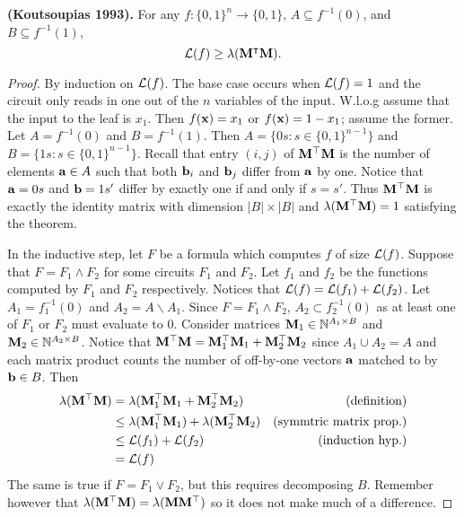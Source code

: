\documentclass[11pt]{article}
\begin{document}
	\begin{theorem}
		\textbf{(Koutsoupias 1993).} For any $f: \{0, 1\}^n \rightarrow \{0,1\}$, $A \subseteq f^{-1}(0)$, and $B \subseteq f^{-1}(1)$,
		\[\mathcal{L}(f) \geq \lambda(\mathbf{M}^{\intercal}\mathbf{M}).\]
	\end{theorem}
	\begin{proof}
		By induction on $\mathcal{L}(f)$. The base case occurs when $\mathcal{L}(f) = 1$ and the circuit only reads in one out of the $n$ variables of the input. W.l.o.g assume that the input to the leaf is $x_1$. Then $f(\mathbf{x}) = x_1$ or $f(\mathbf{x}) = 1 - x_1$; assume the former. Let $A = f^{-1}(0)$ and $B = f^{-1}(1)$. Then $A = \{0s: s \in \{0,1\}^{n-1}\}$ and $B = \{1s: s \in \{0,1\}^{n-1}\}$. Recall that entry $(i,j)$ of $\mathbf{M}^{\top}\mathbf{M}$ is the number of elements $\mathbf{a} \in A$ such that both $\mathbf{b}_i$ and $\mathbf{b}_j$ differ from $\mathbf{a}$ by one. Notice that $\mathbf{a} = 0s$ and $\mathbf{b} = 1s'$ differ by exactly one if and only if $s = s'$. Thus $\mathbf{M}^{\top}\mathbf{M}$ is exactly the identity matrix with dimension $|B| \times |B|$ and $\lambda(\mathbf{M}^{\top}\mathbf{M}) = 1$ satisfying the theorem.  
		
		In the inductive step, let $F$ be a formula which computes $f$ of size $\mathcal{L}(f)$. Suppose that $F = F_1 \land F_2$ for some circuits $F_1$ and $F_2$. Let $f_1$ and $f_2$ be the functions computed by $F_1$ and $F_2$ respectively. Notices that $\mathcal{L}(f) = \mathcal{L}(f_1) + \mathcal{L}(f_2)$. Let $A_1 = f_1^{-1}(0)$ and $A_2 = A \backslash A_1$. Since $F = F_1 \land F_2$, $A_2 \subset f_2^{-1}(0)$ as at least one of $F_1$ or $F_2$ must evaluate to $0$. Consider matrices $\mathbf{M}_1 \in \mathbb{N}^{A_1 \times B}$ and $\mathbf{M}_2 
		\in \mathbb{N}^{A_2 \times B}$. Notice that $\mathbf{M}^{\top}\mathbf{M} = \mathbf{M}_1^{\top}\mathbf{M}_1 + \mathbf{M}_2^{\top}\mathbf{M}_2$ since $A_1 \cup A_2 = A$ and each matrix product counts the number of off-by-one vectors $\mathbf{a}$ matched to by $\mathbf{b} \in B$. Then
		\begin{align*}
			\lambda(\mathbf{M}^{\top}\mathbf{M}) &= \lambda(\mathbf{M}_1^{\top}\mathbf{M}_1 + \mathbf{M}_2^{\top}\mathbf{M}_2) &\mbox{(definition)}\\
			&\leq \lambda(\mathbf{M}_1^{\top}\mathbf{M}_1) + \lambda(\mathbf{M}_2^{\top}\mathbf{M}_2) &\mbox{(symmtric matrix prop.)}\\ 
			&\leq \mathcal{L}(f_1) + \mathcal{L}(f_2) &\mbox{(induction hyp.)}\\ 
			&= \mathcal{L}(f)
		\end{align*} 
		The same is true if $F = F_1 \lor F_2$, but this requires decomposing $B$. Remember however that $\lambda(\mathbf{M}^{\top}\mathbf{M}) = \lambda(\mathbf{M}\mathbf{M}^{\top})$ so it does not make much of a difference.
	\end{proof}
	
\end{document}
